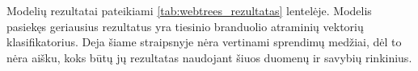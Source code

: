 Modelių rezultatai pateikiami \vref{tab:webtrees_rezultatas} lentelėje. Modelis pasiekęs geriausius rezultatus yra tiesinio branduolio atraminių vektorių klasifikatorius. Deja šiame straipsnyje nėra vertinami sprendimų medžiai, dėl to nėra aišku, koks būtų jų rezultatas naudojant šiuos duomenų ir savybių rinkinius.